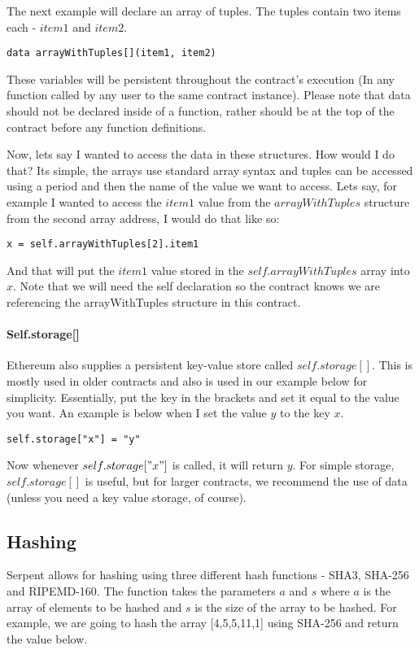 \documentclass[12pt]{article}
\begin{document}
The next example will declare an array of tuples. The tuples contain two items each - $item1$ and $item2$.

\begin{verbatim}
data arrayWithTuples[](item1, item2)
\end{verbatim}

These variables will be persistent throughout the contract's execution (In any function called by any user to the same contract instance). Please note that data should not be declared inside of a function, rather should be at the top of the contract before any function definitions.

Now, lets say I wanted to access the data in these structures. How would I do that? Its simple, the arrays use standard array syntax and tuples can be accessed using a period and then the name of the value we want to access. Lets say, for example I wanted to access the $item1$ value from the $arrayWithTuples$ structure from the second array address, I would do that like so:

\begin{verbatim}
x = self.arrayWithTuples[2].item1
\end{verbatim}

And that will put the $item1$ value stored in the $self.arrayWithTuples$ array into $x$. \cite{Serpent} Note that we will need the self declaration so the contract knows we are referencing the arrayWithTuples structure in this contract.

\paragraph{Self.storage[]}
Ethereum also supplies a persistent key-value store called $self.storage[]$. This is mostly used in older contracts and also is used in our example below for simplicity. Essentially, put the key in the brackets and set it equal to the value you want. An example is below when I set the value $y$ to the key $x$.

\begin{verbatim}
self.storage["x"] = "y"
\end{verbatim}

Now whenever $self.storage["x"]$ is called, it will return $y$. For simple storage, $self.storage[]$ is useful, but for larger contracts, we recommend the use of data (unless you need a key value storage, of course). \cite{Serpent, Serpent1.0(old)}

\subsection{Hashing}
Serpent allows for hashing using three different hash functions - SHA3, SHA-256 and RIPEMD-160. The function takes the parameters $a$ and $s$ where $a$ is the array of elements to be hashed and $s$ is the size of the array to be hashed. For example, we are going to hash the array [4,5,5,11,1] using SHA-256 and return the value below. \cite{Serpent}
\end{document}
